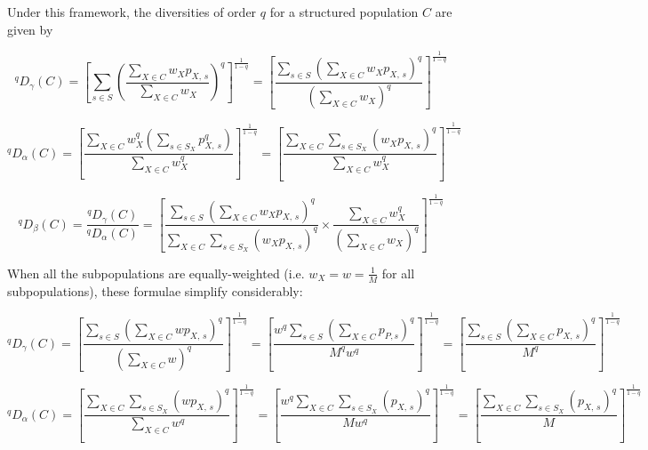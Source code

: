 Under this framework, the diversities of order $q$ for a structured population $C$ are given \parencite{jost2007partitioning} by

\begin{equation}
^qD_\gamma(C)
= \left[\sum_{s \in S} \left(\frac{\displaystyle\sum_{X \in C} w_Xp_{X,\,s}}{\displaystyle\sum_{X \in C} w_X}\right)^q\right]^\frac{1}{1-q}
= \left[\frac{\displaystyle\sum_{s \in S}\left(\sum_{X \in C} w_Xp_{X,\,s}\right)^q}{\displaystyle\left(\sum_{X \in C} w_X\right)^q}\right]^\frac{1}{1-q}
\label{eq:diversity_gamma}
\end{equation}

\begin{equation}
^qD_\alpha(C)
= \left[\frac{\displaystyle\sum_{X \in C} w_X^q \left(\sum_{s \in S_X} p_{X,\,s}^q\right)}{\displaystyle\sum_{X \in C} w_X^q}\right]^\frac{1}{1-q}
= \left[\frac{\displaystyle\sum_{X \in C}\sum_{s \in S_X} (w_Xp_{X,\,s})^q}{\displaystyle\sum_{X \in C} w_X^q}\right]^\frac{1}{1-q}
\label{eq:diversity_alpha}
\end{equation}

\begin{equation}
^qD_\beta(C) = \frac{^qD_\gamma(C)}{^qD_\alpha(C)}
= \left[
\frac{\displaystyle\sum_{s \in S}\left(\sum_{X \in C} w_Xp_{X,\,s}\right)^q}
{\displaystyle\sum_{X \in C}\sum_{s \in S_X} (w_Xp_{X,\,s})^q}
\times
\frac{\displaystyle\sum_{X \in C} w_X^q}
{\displaystyle\left(\sum_{X \in C} w_X\right)^q}
\right]^\frac{1}{1-q}
\label{eq:diversity_beta}
\end{equation}

\noindent When all the subpopulations are equally-weighted (i.e. $w_X = w = \frac{1}{M}$ for all subpopulations), these formulae simplify considerably:

\begin{equation}
^qD_\gamma(C)
= \left[\frac{\displaystyle\sum_{s \in S}\left(\sum_{X \in C} wp_{X,\,s}\right)^q}{\displaystyle\left(\sum_{X \in C} w\right)^q}\right]^\frac{1}{1-q}
= \left[\frac{\displaystyle w^q\sum_{s \in S}\left(\sum_{X \in C} p_{P,s}\right)^q}{\displaystyle M^qw^q}\right]^\frac{1}{1-q}
= \left[\frac{\displaystyle\sum_{s \in S}\left(\sum_{X \in C} p_{X,\,s}\right)^q}{\displaystyle M^q}\right]^\frac{1}{1-q}
\label{eq:diversity_gamma_even}
\end{equation}

\begin{equation}
^qD_\alpha(C)
= \left[\frac{\displaystyle\sum_{X \in C}\sum_{s \in S_X} (wp_{X,\,s})^q}{\displaystyle\sum_{X \in C} w^q}\right]^\frac{1}{1-q}
= \left[\frac{\displaystyle w^q\sum_{X \in C}\sum_{s \in S_X} (p_{X,\,s})^q}{\displaystyle M w^q}\right]^\frac{1}{1-q}
= \left[\frac{\displaystyle \sum_{X \in C}\sum_{s \in S_X} (p_{X,\,s})^q}{\displaystyle M}\right]^\frac{1}{1-q}
\label{eq:diversity_alpha_even}
\end{equation}

